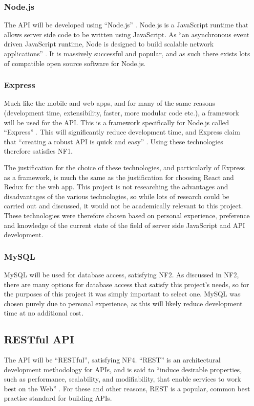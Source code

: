 \documentclass[11pt,openright,a4paper]{report}
\begin{document}
\subsubsection{Node.js}
The API will be developed using \enquote{Node.js} \parencite{nodejs}. Node.js is a JavaScript runtime that allows server side code to be written using JavaScript. As \enquote{an asynchronous event driven JavaScript runtime, Node is designed to build scalable network applications} \parencite{nodejsabout}. It is massively successful and popular, and as such there exists lots of compatible open source software for Node.js.

\subsubsection{Express}
Much like the mobile and web apps, and for many of the same reasons (development time, extensibility, faster, more modular code etc.), a framework will be used for the API. This is a framework specifically for Node.js called \enquote{Express} \parencite{expressjs}. This will significantly reduce development time, and Express claim that \enquote{creating a robust API is quick and easy} \parencite{expressjs}. Using these technologies therefore satisfies NF1.

The justification for the choice of these technologies, and particularly of Express as a framework, is much the same as the justification for choosing React and Redux for the web app. This project is not researching the advantages and disadvantages of the various technologies, so while lots of research could be carried out and discussed, it would not be academically relevant to this project. These technologies were therefore chosen based on personal experience, preference and knowledge of the current state of the field of server side JavaScript and API development.

\subsubsection{MySQL}
MySQL will be used for database access, satisfying NF2. As discussed in NF2, there are many options for database access that satisfy this project's needs, so for the purposes of this project it was simply important to select one. MySQL was chosen purely due to personal experience, as this will likely reduce development time at no additional cost.

\subsection{RESTful API}
The API will be \enquote{RESTful}, satisfying NF4. \enquote{REST} is an architectural development methodology for APIs, and is said to \enquote{induce desirable properties, such as performance, scalability, and modifiability, that enable services to work best on the Web} \parencite{oraclerest}. For these and other reasons, REST is a popular, common best practise standard for building APIs.
\end{document}
